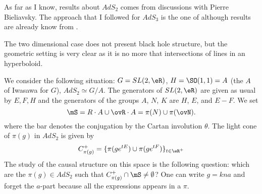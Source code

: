  As far as I know, results about $AdS_2$ comes from discussions with Pierre Bieliavsky. The approach that I followed for $AdS_3$ is the one of \cite{BTZB_un,BTZB_deux} although results are already know from \cite{BTZ_un,BTZ_deux}.

The two dimensional case does not present black hole structure, but the geometric setting is very clear as it is no more that intersections of lines in an hyperboloid.

We consider the following situation: $G=SL(2,\eR)$, $H=\SO(1,1)=A$ (the $A$ of Iwasawa for $G$), $AdS_2\simeq G/A$. The generators of $SL(2,\eR)$ are given as usual by $E,F,H$ and the generators of the groups $A$, $N$, $K$ are $H$, $E$, and $E-F$. We set
\[
\mS=R\cdot A\cup \ovR\cdot A=\pi(N)\cup\pi(\ovN).
\]
where the bar denotes the conjugation by the Cartan involution $\theta$. The light cone of $\pi(g)$ in $AdS_2$ is given by
\begin{equation}
C^+_{\pi(g)}=\{ \pi(ge^{tE})\cup\pi(ge^{tF}) \}_{t\in\eR^+}
\end{equation}
The study of the causal structure on this space is the following question: which are the $\pi(g)\in AdS_2$ such that $C^+_{\pi(g)}\cap\mS\neq \emptyset$? One can write $g=kna$ and forget the $a$-part because all the expressions appears in a $\pi$.

